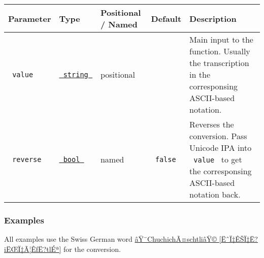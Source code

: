 \begin{longtable}[]{@{}lllll@{}}
\toprule\noalign{}
Parameter & Type & Positional / Named & Default & Description \\
\midrule\noalign{}
\endhead
\bottomrule\noalign{}
\endlastfoot
\texttt{\ value\ } &
\href{https://typst.app/docs/reference/foundations/str/}{\texttt{\ string\ }}
& positional & & Main input to the function. Usually the transcription
in the corresponsing ASCII-based notation. \\
\texttt{\ reverse\ } &
\href{https://typst.app/docs/reference/foundations/bool/}{\texttt{\ bool\ }}
& named & \texttt{\ false\ } & Reverses the conversion. Pass Unicode IPA
into \texttt{\ value\ } to get the corresponsing ASCII-based notation
back. \\
\end{longtable}

\subsubsection{Examples}\label{examples}

All examples use the Swiss German word
\href{https://als.wikipedia.org/wiki/Chuchich\%C3\%A4schtli}{âŸ¨ChuchichÃ¤schtliâŸ©
{[}ËˆÏ‡ÊŠÏ‡Ë?iËŒÏ‡Ã¦ÊƒË?tlÉª{]}} for the conversion.

